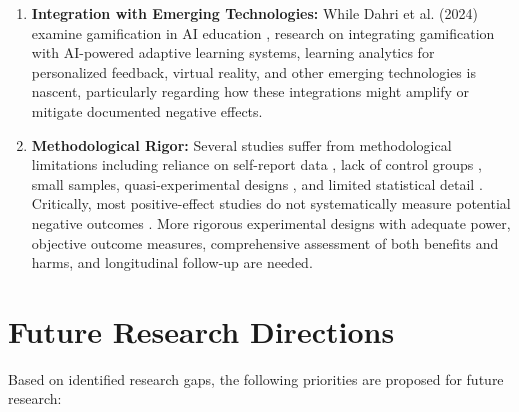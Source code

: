 \documentclass[12pt,a4paper]{article}
\begin{document}
\begin{enumerate}
    \item \textbf{Integration with Emerging Technologies:} While Dahri et al. (2024) examine gamification in AI education \parencite{dahri2024}, research on integrating gamification with AI-powered adaptive learning systems, learning analytics for personalized feedback, virtual reality, and other emerging technologies is nascent, particularly regarding how these integrations might amplify or mitigate documented negative effects.
    
    \item \textbf{Methodological Rigor:} Several studies suffer from methodological limitations including reliance on self-report data \parencite{dahri2024}, lack of control groups \parencite{wang2023}, small samples, quasi-experimental designs \parencite{rodriguez2025,ojonuba2023}, and limited statistical detail \parencite{wang2023,sevilla2024}. Critically, most positive-effect studies do not systematically measure potential negative outcomes \parencite{surendeleg2024}. More rigorous experimental designs with adequate power, objective outcome measures, comprehensive assessment of both benefits and harms, and longitudinal follow-up are needed.
\end{enumerate}



\section{Future Research Directions}

Based on identified research gaps, the following priorities are proposed for future research:
\end{document}
